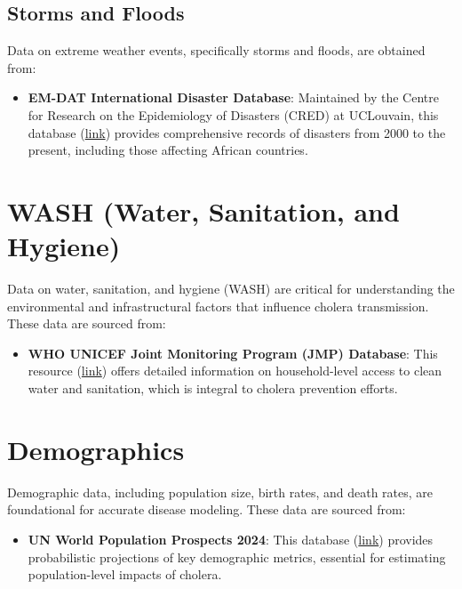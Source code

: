\documentclass[
]{book}
\providecommand{\tightlist}{%
  \setlength{\itemsep}{0pt}\setlength{\parskip}{0pt}}
\begin{document}
\subsection{Storms and Floods}\label{storms-and-floods}

Data on extreme weather events, specifically storms and floods, are obtained from:

\begin{itemize}
\tightlist
\item
  \textbf{EM-DAT International Disaster Database}: Maintained by the Centre for Research on the Epidemiology of Disasters (CRED) at UCLouvain, this database (\href{https://www.emdat.be/}{link}) provides comprehensive records of disasters from 2000 to the present, including those affecting African countries.
\end{itemize}

\section{WASH (Water, Sanitation, and Hygiene)}\label{wash-water-sanitation-and-hygiene}

Data on water, sanitation, and hygiene (WASH) are critical for understanding the environmental and infrastructural factors that influence cholera transmission. These data are sourced from:

\begin{itemize}
\tightlist
\item
  \textbf{WHO UNICEF Joint Monitoring Program (JMP) Database}: This resource (\href{https://washdata.org/data/household}{link}) offers detailed information on household-level access to clean water and sanitation, which is integral to cholera prevention efforts.
\end{itemize}

\section{Demographics}\label{demographics}

Demographic data, including population size, birth rates, and death rates, are foundational for accurate disease modeling. These data are sourced from:

\begin{itemize}
\tightlist
\item
  \textbf{UN World Population Prospects 2024}: This database (\href{https://population.un.org/wpp/Download/}{link}) provides probabilistic projections of key demographic metrics, essential for estimating population-level impacts of cholera.
\end{itemize}
\end{document}
